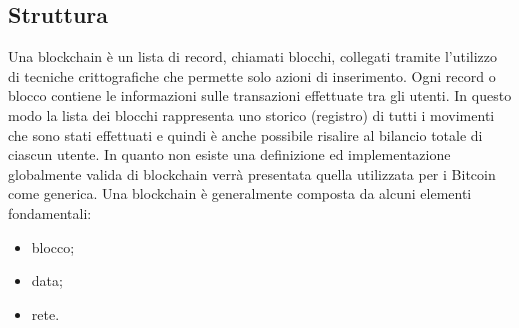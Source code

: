 \begin{enumerate}[1.]
\section{Struttura}
Una blockchain è un lista di record, chiamati blocchi, collegati tramite l'utilizzo di tecniche crittografiche che permette solo azioni di inserimento. Ogni record o blocco contiene le informazioni sulle transazioni effettuate tra gli utenti.
In questo modo la lista dei blocchi rappresenta uno storico (registro) di tutti i movimenti che sono stati effettuati e quindi è anche possibile risalire al bilancio totale di ciascun utente.
In quanto non esiste una definizione ed implementazione globalmente valida di blockchain verrà presentata quella utilizzata per i Bitcoin come generica.\newline
Una blockchain è generalmente composta da alcuni elementi fondamentali:
\begin{itemize}
    \item blocco;
    \item data;
    \item rete.
\end{itemize}


\end{enumerate}
